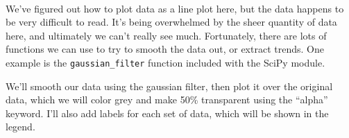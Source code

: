     \begin{center}
    \end{center}
    { \hspace*{\fill} \\}
    
    We've figured out how to plot data as a line plot here, but the data
happens to be very difficult to read. It's being overwhelmed by the
sheer quantity of data here, and ultimately we can't really see much.
Fortunately, there are lots of functions we can use to try to smooth the
data out, or extract trends. One example is the
\texttt{gaussian\_filter} function included with the SciPy module.

We'll smooth our data using the gaussian filter, then plot it over the
original data, which we will color grey and make 50\% transparent using
the ``alpha'' keyword. I'll also add labels for each set of data, which
will be shown in the legend.

